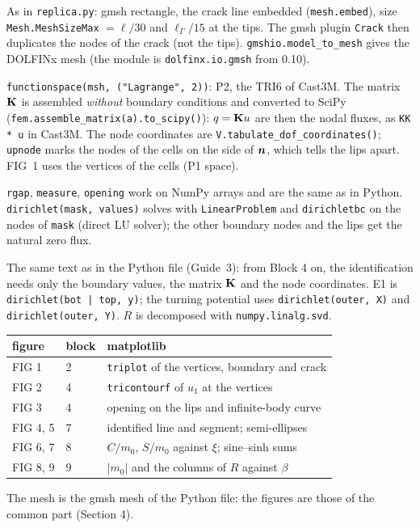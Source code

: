 As in \texttt{replica.py}: gmsh
rectangle, the crack line embedded (\texttt{mesh.embed}), size
\texttt{Mesh.MeshSizeMax} $=\ell/30$ and $\ell_\Gamma/15$ at the tips. The gmsh
plugin \texttt{Crack} then duplicates the nodes of the crack (not the tips).
\texttt{gmshio.model\_to\_mesh} gives the DOLFINx mesh (the module is
\texttt{dolfinx.io.gmsh} from 0.10).

 \texttt{functionspace(msh, ("Lagrange", 2))}: P2,
the TRI6 of Cast3M. The matrix $\mathbf{K}$ is assembled \emph{without} boundary
conditions and converted to SciPy (\texttt{fem.assemble\_matrix(a).to\_scipy()}):
$q=\mathbf{K}u$ are then the nodal fluxes, as \texttt{KK * u} in Cast3M. The node
coordinates are \texttt{V.tabulate\_dof\_coordinates()}; \texttt{upnode} marks
the nodes of the cells on the side of $\bm{n}$, which tells the lips apart.
FIG~1 uses the vertices of the cells (P1 space).

 \texttt{rgap}, \texttt{measure}, \texttt{opening}
work on NumPy arrays and are the same as in Python. \texttt{dirichlet(mask,
values)} solves with \texttt{LinearProblem} and \texttt{dirichletbc} on the
nodes of \texttt{mask} (direct LU solver); the other boundary nodes and the
lips get the natural zero flux.

 The same text as in the Python file (Guide~3): from Block 4
on, the identification needs only the boundary values, the matrix $\mathbf{K}$
and the node coordinates. E1 is \texttt{dirichlet(bot | top, y)}; the turning
potential uses \texttt{dirichlet(outer, X)} and \texttt{dirichlet(outer, Y)}.
$R$ is decomposed with \texttt{numpy.linalg.svd}.

\begin{center}\small
\begin{tabular}{>{\sffamily}l l l}
\toprule
figure & block & matplotlib\\
\midrule
FIG 1 & 2 & \texttt{triplot} of the vertices, boundary and crack\\
FIG 2 & 4 & \texttt{tricontourf} of $u_1$ at the vertices\\
FIG 3 & 4 & opening on the lips and infinite-body curve\\
FIG 4, 5 & 7 & identified line and segment; semi-ellipses\\
FIG 6, 7 & 8 & $C/m_0$, $S/m_0$ against $\xi$; sine--sinh sums\\
FIG 8, 9 & 9 & $|m_0|$ and the columns of $R$ against $\beta$\\
\bottomrule
\end{tabular}
\end{center}
The mesh is the gmsh mesh of the Python file: the figures are those of the
common part (Section 4).

